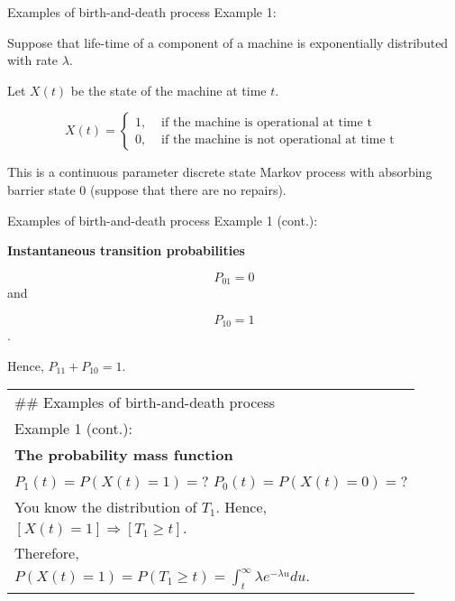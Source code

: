 \documentclass[12pt,ignorenonframetext,]{beamer}
\begin{document}
\begin{frame}{Examples of birth-and-death process}
\protect\hypertarget{examples-of-birth-and-death-process}{}
Example 1:

Suppose that life-time of a component of a machine is exponentially
distributed with rate \(\lambda\).

Let \(X(t)\) be the state of the machine at time \(t\).

\begin{equation} \label{eq3}
X(t)=\left\{
    \begin{array}{ll}
    1, & \text{ if the machine is operational at time t } \\
      0, & \text{ if the machine is not operational at time t }
  \end{array}
  \right.
\end{equation}

This is a continuous parameter discrete state Markov process with
absorbing barrier state 0 (suppose that there are no repairs).
\end{frame}

\begin{frame}{Examples of birth-and-death process}
\protect\hypertarget{examples-of-birth-and-death-process-1}{}
Example 1 (cont.):

\textbf{Instantaneous transition probabilities}

\[P_{01} = 0\] and

\[P_{10}=1\].

Hence, \(P_{11} + P_{10} = 1\).

\begin{longtable}[]{@{}
  >{\raggedright\arraybackslash}p{}@{}}
\toprule
\endhead
\#\# Examples of birth-and-death process \\
Example 1 (cont.): \\
\textbf{The probability mass function} \\
\(P_1(t) = P(X(t)=1)= ?\) \(P_0(t) = P(X(t)=0)= ?\) \\
You know the distribution of \(T_1\). Hence, \\
\([X(t)=1] \Rightarrow [T_1 \geq t].\) \\
Therefore, \\
\(P(X(t)=1) = P(T_1 \geq t) = \int_{t}^{\infty} \lambda e^{-\lambda u}du.\) \\
\bottomrule
\end{longtable}
\end{frame}
\end{document}
